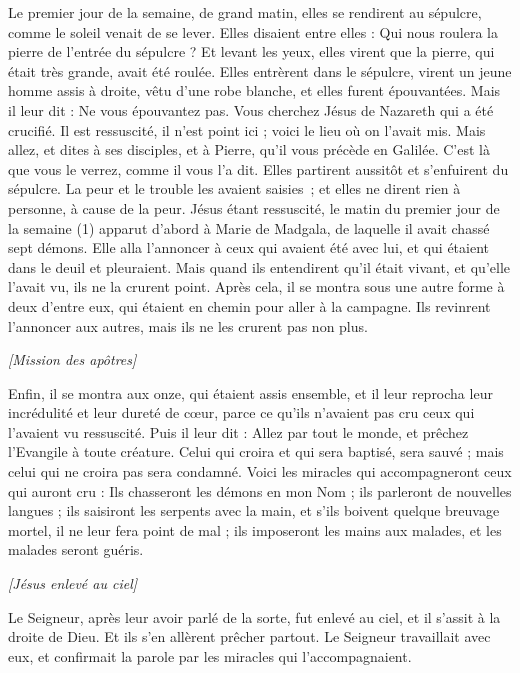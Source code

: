\begin{multicols}{2}
Le premier jour de la semaine, de grand matin, elles se rendirent au sépulcre, comme le soleil venait de se lever.
Elles disaient entre elles : Qui nous roulera la pierre de l'entrée du sépulcre ?
Et levant les yeux, elles virent que la pierre, qui était très grande, avait été roulée.
Elles entrèrent dans le sépulcre, virent un jeune homme assis à droite, vêtu d'une robe blanche, et elles furent épouvantées.
Mais il leur dit : Ne vous épouvantez pas. Vous cherchez Jésus de Nazareth qui a été crucifié. Il est ressuscité, il n'est point ici ; voici le lieu où on l'avait mis.
Mais allez, et dites à ses disciples, et à Pierre, qu'il vous précède en Galilée. C’est là que vous le verrez, comme il vous l'a dit.
Elles partirent aussitôt et s'enfuirent du sépulcre. La peur et le trouble les avaient saisies ; et elles ne dirent rien à personne, à cause de la peur.
Jésus étant ressuscité, le matin du premier jour de la semaine (1) apparut d’abord à Marie de Madgala, de laquelle il avait chassé sept démons.
Elle alla l’annoncer à ceux qui avaient été avec lui, et qui étaient dans le deuil et pleuraient.
Mais quand ils entendirent qu'il était vivant, et qu'elle l'avait vu, ils ne la crurent point.
Après cela, il se montra sous une autre forme à deux d'entre eux, qui étaient en chemin pour aller à la campagne.
Ils revinrent l’annoncer aux autres, mais ils ne les crurent pas non plus.
\begin{center}
\textit{[Mission des apôtres]}
\end{center}
\PPE{}
Enfin, il se montra aux onze, qui étaient assis ensemble, et il leur reprocha leur incrédulité et leur dureté de cœur, parce ce qu'ils n'avaient pas cru ceux qui l'avaient vu ressuscité.
Puis il leur dit : Allez par tout le monde, et prêchez l'Evangile à toute créature.
Celui qui croira et qui sera baptisé, sera sauvé ; mais celui qui ne croira pas sera condamné.
Voici les miracles qui accompagneront ceux qui auront cru : Ils chasseront les démons en mon Nom ; ils parleront de nouvelles langues ;
ils saisiront les serpents avec la main, et s’ils boivent quelque breuvage mortel, il ne leur fera point de mal ; ils imposeront les mains aux malades, et les malades seront guéris.
\begin{center}
\textit{[Jésus enlevé au ciel]}
\end{center}
\PPE{}
Le Seigneur, après leur avoir parlé de la sorte, fut enlevé au ciel, et il s'assit à la droite de Dieu.
Et ils s’en allèrent prêcher partout. Le Seigneur travaillait avec eux, et confirmait la parole par les miracles qui l'accompagnaient.
\PPE{}
\end{multicols}
